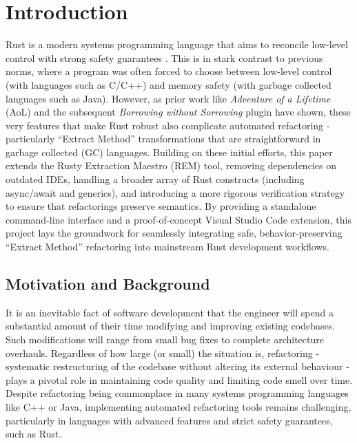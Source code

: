 \setcounter{chapter}{-1} %
\chapter{Introduction}
\label{chap:introduction}

Rust is a modern systems programming language that aims to reconcile low-level
control with strong safety guarantees \cite{the_rust_language}. This is in stark
contrast to previous norms, where a program was often forced to choose between
low-level control (with languages such as C/C++) and memory safety (with garbage
collected languages such as Java). However, as prior work like \textit{Adventure of a
Lifetime} (AoL) \cite{AdventureOfALifetime} and the subsequent \textit{Borrowing
without Sorrowing} \cite{BorrowingWithoutSorrowing} plugin have shown, these
very features that make Rust robust also complicate automated refactoring -
particularly ``Extract Method'' transformations that are straightforward in
garbage collected (GC) languages. Building on these initial efforts, this paper
extends the Rusty Extraction Maestro (REM) tool, removing dependencies on
outdated IDEs, handling a broader array of Rust constructs (including
async/await and generics), and introducing a more rigorous verification strategy
to ensure that refactorings preserve semantics. By providing a standalone
command-line interface and a proof-of-concept Visual Studio Code extension, this
project lays the groundwork for seamlessly integrating safe, behavior-preserving
“Extract Method” refactoring into mainstream Rust development workflows.

\section{Motivation and Background}
\label{sec:motivation}

It is an inevitable fact of software development that the engineer will spend a
substantial amount of their time modifying and improving existing codebases.
Such modifications will range from small bug fixes to complete architecture
overhauls. Regardless of how large (or small) the situation is, refactoring -
systematic restructuring of the codebase without altering its external behaviour
- plays a pivotal role in maintaining code quality and limiting code smell over
time. Despite refactoring being commonplace in many systems programming
languages like C++ or Java, implementing automated refactoring tools remains
challenging, particularly in languages with advanced features and strict safety
guarantees, such as Rust.

